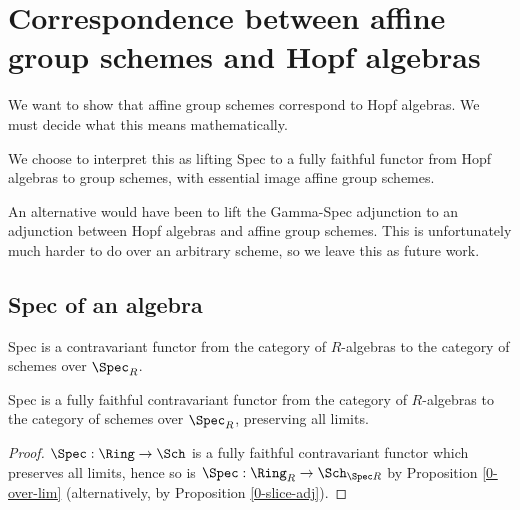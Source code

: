 \section{Correspondence between affine group schemes and Hopf algebras}


We want to show that affine group schemes correspond to Hopf algebras.
We must decide what this means mathematically.

We choose to interpret this as lifting Spec to a fully faithful functor
from Hopf algebras to group schemes,
with essential image affine group schemes.

An alternative would have been to lift the Gamma-Spec adjunction to an adjunction between
Hopf algebras and affine group schemes.
This is unfortunately much harder to do over an arbitrary scheme,
so we leave this as future work.


\subsection{Spec of an algebra}


\begin{definition}
  \label{0-spec-alg}
  \leanok

  Spec is a contravariant functor from the category of $R$-algebras
  to the category of schemes over $\Spec_R$.
\end{definition}


\begin{proposition}
  \label{0-full-faithful-spec-alg}
  \leanok

  Spec is a fully faithful contravariant functor from the category of $R$-algebras
  to the category of schemes over $\Spec_R$, preserving all limits.
\end{proposition}
\begin{proof}
  \leanok

  $\Spec : \Ring \to \Sch$ is a fully faithful contravariant functor which preserves all limits,
  hence so is $\Spec : \Ring_R \to \Sch_{\Spec R}$ by Proposition \ref{0-over-lim}
  (alternatively, by Proposition \ref{0-slice-adj}).
\end{proof}



